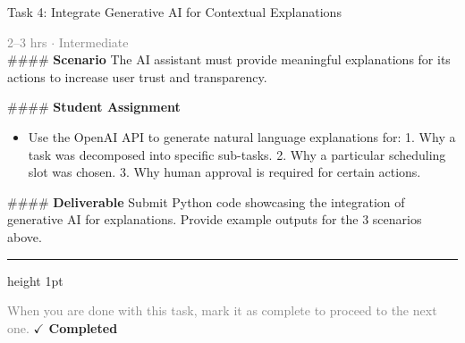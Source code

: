 \documentclass[10pt,a4paper]{article}
\begin{document}
\begin{taskbox}{Task 4: Integrate Generative AI for Contextual Explanations}

    {\small \textcolor{gray}{2--3 hrs $\cdot$ Intermediate}}\\[12pt]

    \#\#\#\# \textbf{Scenario}
The AI assistant must provide meaningful explanations for its actions to increase user trust and transparency.

\#\#\#\# \textbf{Student Assignment}
\begin{itemize}
    \item Use the OpenAI API to generate natural language explanations for:
  1. Why a task was decomposed into specific sub-tasks.
  2. Why a particular scheduling slot was chosen.
  3. Why human approval is required for certain actions.
\end{itemize}

\#\#\#\# \textbf{Deliverable}
Submit Python code showcasing the integration of generative AI for explanations. Provide example outputs for the 3 scenarios above.\par

    \vspace{16pt}

    \textcolor{cardBorder}{\hrule height 1pt}\vspace{8pt}

    \small \textcolor{gray}{When you are done with this task, mark it as complete to proceed to the next one.} \hfill \textbf{\textcolor{brandDark}{$\checkmark$ Completed}}

\end{taskbox}
\end{document}
